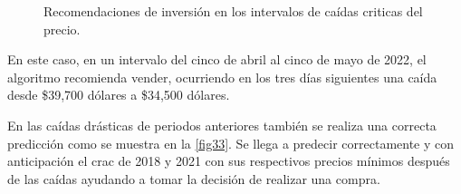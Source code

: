 \begin{figure}[h!]
	\centering
	\qquad
	\qquad
	\qquad
	
	\caption{Recomendaciones de inversión en los intervalos de caídas criticas del precio.}
	\label{fig33}
\end{figure}

En este caso, en un intervalo del cinco de abril al cinco de mayo de 2022, el algoritmo recomienda vender, ocurriendo en los tres días siguientes una caída desde \$39,700 dólares a \$34,500 dólares.

En las caídas drásticas de periodos anteriores  también se realiza una correcta predicción como se muestra en la \autoref{fig33}. Se llega a predecir correctamente y con anticipación el crac de 2018 y 2021 con sus respectivos precios mínimos después de las caídas ayudando a tomar la decisión de realizar una compra.
